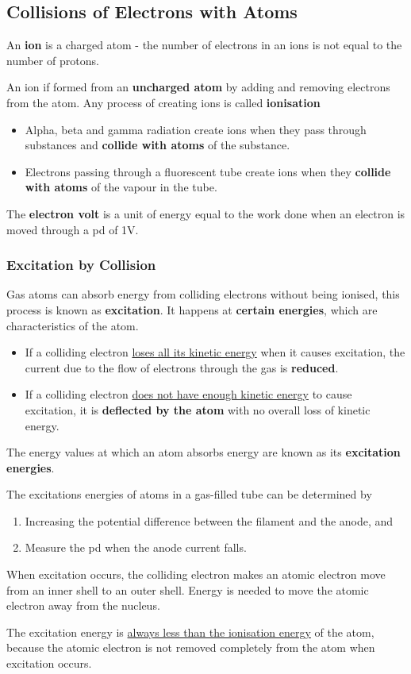 \subsection{Collisions of Electrons with Atoms}

An \textbf{ion} is a charged atom - the number of electrons in an ions is not equal to the number of protons.

An ion if formed from an \textbf{uncharged atom} by adding and removing electrons from the atom. Any process of creating ions is called \textbf{ionisation}
\begin{itemize}
    \item Alpha, beta and gamma radiation create ions when they pass through substances and \textbf{collide with atoms} of the substance.
    \item Electrons passing through a fluorescent tube create ions when they \textbf{collide with atoms} of the vapour in the tube.
\end{itemize}

The \textbf{electron volt} is a unit of energy equal to the work done when an electron is moved through a pd of 1V.

\subsubsection*{Excitation by Collision}

Gas atoms can absorb energy from colliding electrons without being ionised, this process is known as \textbf{excitation}. It happens at \textbf{certain energies}, which are characteristics of the atom.
\begin{itemize}
    \item If a colliding electron \underline{loses all its kinetic energy} when it causes excitation, the current due to the flow of electrons through the gas is \textbf{reduced}.
    \item If a colliding electron \underline{does not have enough kinetic energy} to cause excitation, it is \textbf{deflected by the atom} with no overall loss of kinetic energy.
\end{itemize}

The energy values at which an atom absorbs energy are known as its \textbf{excitation energies}.

The excitations energies of atoms in a gas-filled tube can be determined by
\begin{enumerate}
    \item Increasing the potential difference between the filament and the anode, and
    \item Measure the pd when the anode current falls.
\end{enumerate}

When excitation occurs, the colliding electron makes an atomic electron move from an inner shell to an outer shell. Energy is needed to move the atomic electron away from the nucleus.

The excitation energy is \underline{always less than the ionisation energy} of the atom, because the atomic electron is not removed completely from the atom when excitation occurs.

